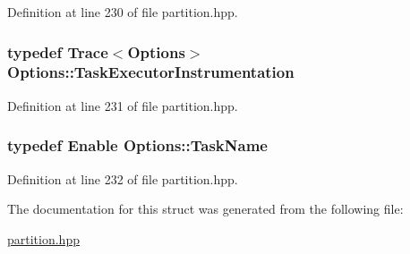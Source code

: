Definition at line 230 of file partition.hpp.\hypertarget{struct_options_a335bba1a97e116e203888f0581f17bc6}{
\subsubsection[{TaskExecutorInstrumentation}]{\setlength{\rightskip}{0pt plus 5cm}typedef Trace$<${\bf Options}$>$ {\bf Options::TaskExecutorInstrumentation}}}
\label{struct_options_a335bba1a97e116e203888f0581f17bc6}


Definition at line 231 of file partition.hpp.\hypertarget{struct_options_a6a43239596fc6edced534372fec5a7fa}{
\subsubsection[{TaskName}]{\setlength{\rightskip}{0pt plus 5cm}typedef Enable {\bf Options::TaskName}}}
\label{struct_options_a6a43239596fc6edced534372fec5a7fa}


Definition at line 232 of file partition.hpp.

The documentation for this struct was generated from the following file:\begin{DoxyCompactItemize}
\item 
\hyperlink{partition_8hpp}{partition.hpp}\end{DoxyCompactItemize}
